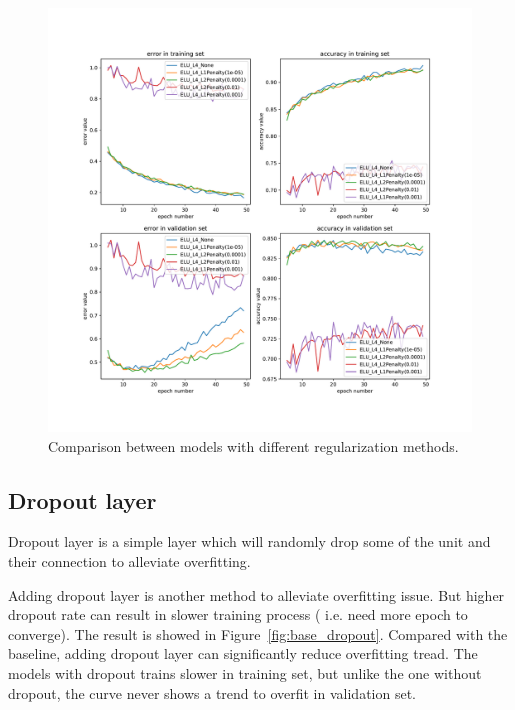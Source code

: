 \documentclass{article}
\begin{document}
\begin{figure}[tb]
\begin{center}
\centerline{\includegraphics[width=\columnwidth]{fig/reg.pdf}}
\caption{Comparison between models with different regularization methods.}
\label{fig:base_reg}
\end{center}
\end{figure} 


\subsection{Dropout layer}

Dropout layer \citep{JMLR:v15:srivastava14a} is a simple layer which will randomly drop some of the unit and their connection to alleviate  overfitting.

Adding dropout layer is another method to alleviate overfitting issue. But higher dropout rate can result in slower training process ( i.e.  need more epoch to converge). The result is showed in Figure~\ref{fig:base_dropout}. Compared with the baseline, adding dropout layer can  significantly reduce overfitting tread. The models with dropout trains slower in training set, but unlike the one without dropout, the curve never shows a trend to overfit in validation set.  

\end{document}
